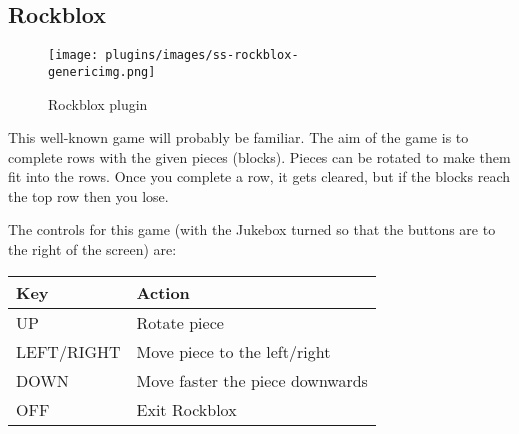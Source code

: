 \subsection{Rockblox}
\begin{figure}[h!]
\begin{center}
\texttt{[image: plugins/images/ss-rockblox-\\genericimg.png]}
\end{center}
\caption{Rockblox plugin}
\end{figure}

This well{}-known game will probably be familiar. The aim of the game is
to complete rows with the given pieces (blocks). Pieces can be rotated
to make them fit into the rows.  Once you complete a row, it gets
cleared, but if the blocks reach the top row then you lose.

The controls for this game (with the Jukebox turned so that the buttons
are to the right of the screen) are:

\begin{table}[h!]
\begin{center}
\begin{tabular}{@{}ll@{}}\toprule
\textbf{Key} & \textbf{Action} \\\midrule
UP & Rotate piece \\
LEFT/RIGHT & Move piece to the left/right \\
DOWN & Move faster the piece downwards \\
OFF & Exit Rockblox\\\bottomrule
\end{tabular}
\end{center}
\end{table}
